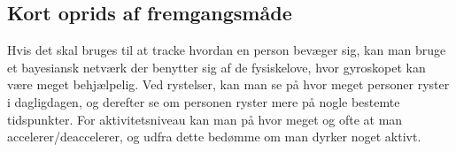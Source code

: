 \subsection{Kort oprids af fremgangsmåde} Hvis det skal bruges til at tracke hvordan en person bevæger sig, kan man bruge et bayesiansk netværk der benytter sig af de fysiskelove, hvor gyroskopet kan være meget behjælpelig. Ved rystelser, kan man se på hvor meget personer ryster i dagligdagen, og derefter se om personen ryster mere på nogle bestemte tidspunkter. For aktivitetsniveau kan man på hvor meget og ofte at man accelerer/deaccelerer, og udfra dette bedømme om man dyrker noget aktivt.